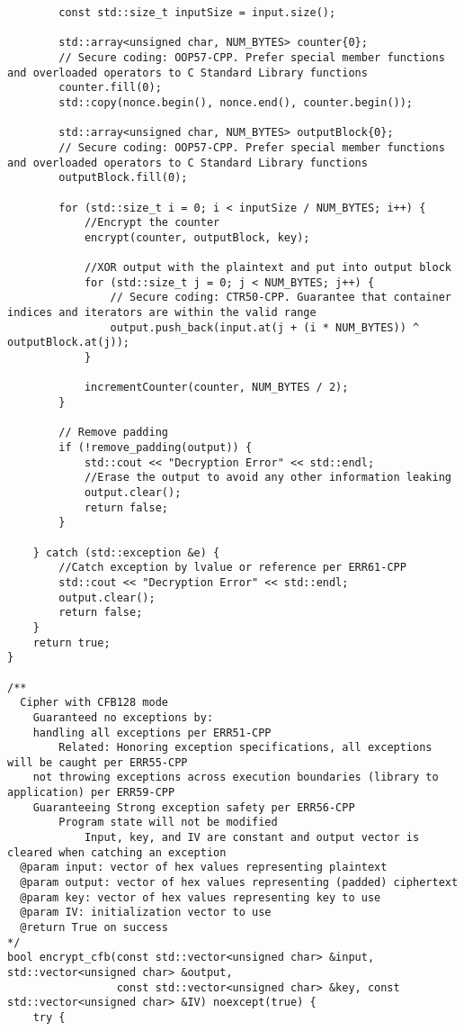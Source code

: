 \documentclass[a4paper,12pt]{article}
\begin{document}
{\begin{lstlisting}
        const std::size_t inputSize = input.size();

        std::array<unsigned char, NUM_BYTES> counter{0};
        // Secure coding: OOP57-CPP. Prefer special member functions and overloaded operators to C Standard Library functions
        counter.fill(0);
        std::copy(nonce.begin(), nonce.end(), counter.begin());

        std::array<unsigned char, NUM_BYTES> outputBlock{0};
        // Secure coding: OOP57-CPP. Prefer special member functions and overloaded operators to C Standard Library functions
        outputBlock.fill(0);

        for (std::size_t i = 0; i < inputSize / NUM_BYTES; i++) {
            //Encrypt the counter
            encrypt(counter, outputBlock, key);

            //XOR output with the plaintext and put into output block
            for (std::size_t j = 0; j < NUM_BYTES; j++) {
                // Secure coding: CTR50-CPP. Guarantee that container indices and iterators are within the valid range
                output.push_back(input.at(j + (i * NUM_BYTES)) ^ outputBlock.at(j));
            }

            incrementCounter(counter, NUM_BYTES / 2);
        }

        // Remove padding
        if (!remove_padding(output)) {
            std::cout << "Decryption Error" << std::endl;
            //Erase the output to avoid any other information leaking
            output.clear();
            return false;
        }

    } catch (std::exception &e) {
        //Catch exception by lvalue or reference per ERR61-CPP
        std::cout << "Decryption Error" << std::endl;
        output.clear();
        return false;
    }
    return true;
}

/**
  Cipher with CFB128 mode
    Guaranteed no exceptions by:
    handling all exceptions per ERR51-CPP
        Related: Honoring exception specifications, all exceptions will be caught per ERR55-CPP
    not throwing exceptions across execution boundaries (library to application) per ERR59-CPP
    Guaranteeing Strong exception safety per ERR56-CPP
        Program state will not be modified
            Input, key, and IV are constant and output vector is cleared when catching an exception
  @param input: vector of hex values representing plaintext
  @param output: vector of hex values representing (padded) ciphertext
  @param key: vector of hex values representing key to use
  @param IV: initialization vector to use
  @return True on success
*/
bool encrypt_cfb(const std::vector<unsigned char> &input, std::vector<unsigned char> &output,
                 const std::vector<unsigned char> &key, const std::vector<unsigned char> &IV) noexcept(true) {
    try {


\end{lstlisting}}
\end{document}
